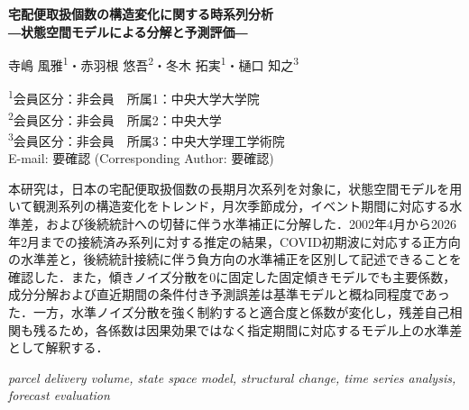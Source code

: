 \documentclass[uplatex,a4paper,10pt]{jsarticle}
\newcommand{\jtitle}{
宅配便取扱個数の構造変化に関する時系列分析\\
―状態空間モデルによる分解と予測評価―
}
\newcommand{\jauthors}{
寺嶋 風雅\textsuperscript{1}・赤羽根 悠吾\textsuperscript{2}・冬木 拓実\textsuperscript{1}・樋口 知之\textsuperscript{3}
}
\newcommand{\jaffiliations}{
\textsuperscript{1}会員区分：非会員　所属1：中央大学大学院\\
\textsuperscript{2}会員区分：非会員　所属2：中央大学\\
\textsuperscript{3}会員区分：非会員　所属3：中央大学理工学術院\\
E-mail: 要確認 (Corresponding Author: 要確認)
}
\begin{document}
\begin{center}
  \begin{minipage}{150mm}
      \centering
      {\gtfamily\bfseries\fontsize{20pt}{24pt}\selectfont \jtitle\par}
      \vspace{15mm}
      {\fontsize{12pt}{15pt}\selectfont \jauthors\par}
      \vspace{5mm}
      {\fontsize{9pt}{12pt}\selectfont \jaffiliations\par}
      \vspace{10mm}
      \raggedright
      {\fontsize{9pt}{12pt}\selectfont
      本研究は，日本の宅配便取扱個数の長期月次系列を対象に，状態空間モデルを用いて観測系列の構造変化をトレンド，月次季節成分，イベント期間に対応する水準差，および後続統計への切替に伴う水準補正に分解した．2002年4月から2026年2月までの接続済み系列に対する推定の結果，COVID初期波に対応する正方向の水準差と，後続統計接続に伴う負方向の水準補正を区別して記述できることを確認した．また，傾きノイズ分散を0に固定した固定傾きモデルでも主要係数，成分分解および直近期間の条件付き予測誤差は基準モデルと概ね同程度であった．一方，水準ノイズ分散を強く制約すると適合度と係数が変化し，残差自己相関も残るため，各係数は因果効果ではなく指定期間に対応するモデル上の水準差として解釈する．\par}
      \vspace{\baselineskip}
      {\fontsize{10pt}{12pt}\selectfont {\bfseries\itshape Key Words:\ }\textit{parcel delivery volume, state space model, structural change, time series analysis, forecast evaluation}\par}
      \vspace{10mm}
  \end{minipage}
\end{center}
\end{document}
